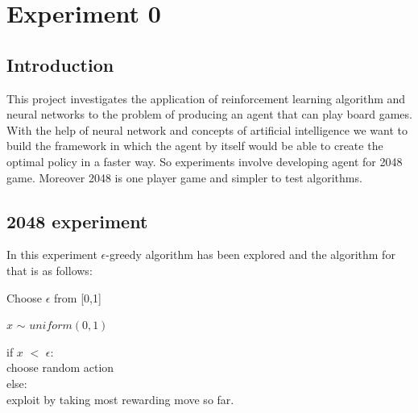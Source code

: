 \chapter{Experiment 0}
\section{Introduction}
This project investigates the application of reinforcement learning algorithm and neural networks to the problem of producing an agent that can play board games. With the help of neural network and concepts of artificial intelligence we want to build the framework in which the agent by itself would be able to create the optimal policy in a faster way. So experiments involve developing agent for 2048 game. Moreover 2048 is one player game and simpler to test algorithms.

\section{2048 experiment}
In this experiment $\epsilon$-greedy algorithm has been explored and the algorithm for that is as follows:

\begin{steps}
 \item Choose $\epsilon$ from [0,1] 
 \item $x$ $\sim$ $uniform(0,1)$
 \item if $x$ $<$ $\epsilon$:\\
 	\hspace{30mm} choose random action\\
 	else:\\
 	\hspace{15mm}exploit by taking most rewarding move so far.
 	
\end{steps}

